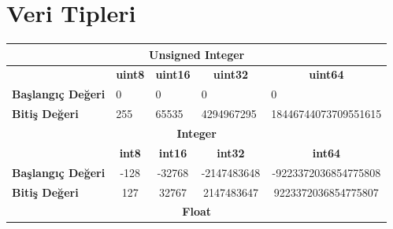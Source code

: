 \vspace{15mm}
\section{Veri Tipleri}
\vspace{7mm}

\begin{table}[!htb]
\begin{tabular}{|lcccc|}
\hline
\multicolumn{5}{|c|}{\textbf{Unsigned Integer}}                                                                                                                                                                 \\ \hline
\multicolumn{1}{|l|}{}                          & \multicolumn{1}{c|}{\textbf{uint8}} & \multicolumn{1}{c|}{\textbf{uint16}} & \multicolumn{1}{c|}{\textbf{uint32}} & \textbf{uint64}                           \\ \hline
\multicolumn{1}{|l|}{\textbf{Başlangıç Değeri}} & \multicolumn{1}{l|}{0}              & \multicolumn{1}{l|}{0}               & \multicolumn{1}{l|}{0}               & \multicolumn{1}{l|}{0}                    \\ \hline
\multicolumn{1}{|l|}{\textbf{Bitiş Değeri}}     & \multicolumn{1}{l|}{255}            & \multicolumn{1}{l|}{65535}           & \multicolumn{1}{l|}{4294967295}      & \multicolumn{1}{l|}{18446744073709551615} \\ \hline
\multicolumn{5}{|c|}{\textbf{Integer}}                                                                                                                                                                          \\ \hline
\multicolumn{1}{|l|}{}                          & \multicolumn{1}{c|}{\textbf{int8}}  & \multicolumn{1}{c|}{\textbf{int16}}  & \multicolumn{1}{c|}{\textbf{int32}}  & \textbf{int64}                            \\ \hline
\multicolumn{1}{|l|}{\textbf{Başlangıç Değeri}} & \multicolumn{1}{c|}{-128}           & \multicolumn{1}{c|}{-32768}          & \multicolumn{1}{c|}{-2147483648}     & -9223372036854775808                                         \\ \hline
\multicolumn{1}{|l|}{\textbf{Bitiş Değeri}}     & \multicolumn{1}{c|}{127}            & \multicolumn{1}{c|}{32767}           & \multicolumn{1}{c|}{2147483647}      & 9223372036854775807                                         \\ \hline
\multicolumn{5}{|c|}{\textbf{Float}}                                                                                                                                                                            \\ \hline

\end{tabular}
\end{table}
